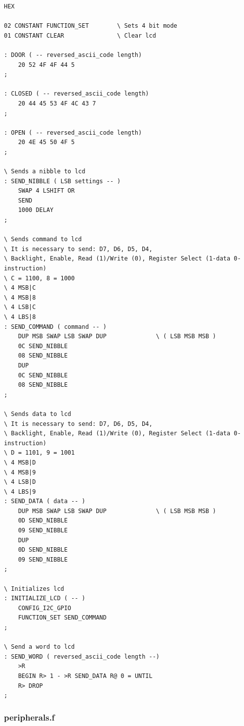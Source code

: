\documentclass[]{article}
\begin{document}
\begin{verbatim}
HEX

02 CONSTANT FUNCTION_SET        \ Sets 4 bit mode
01 CONSTANT CLEAR               \ Clear lcd 

: DOOR ( -- reversed_ascii_code length)
    20 52 4F 4F 44 5 
;

: CLOSED ( -- reversed_ascii_code length)
    20 44 45 53 4F 4C 43 7
;

: OPEN ( -- reversed_ascii_code length)
    20 4E 45 50 4F 5
;

\ Sends a nibble to lcd 
: SEND_NIBBLE ( LSB settings -- )
    SWAP 4 LSHIFT OR
    SEND
    1000 DELAY
;

\ Sends command to lcd 
\ It is necessary to send: D7, D6, D5, D4, 
\ Backlight, Enable, Read (1)/Write (0), Register Select (1-data 0-instruction)
\ C = 1100, 8 = 1000
\ 4 MSB|C 
\ 4 MSB|8
\ 4 LSB|C
\ 4 LBS|8
: SEND_COMMAND ( command -- )
    DUP MSB SWAP LSB SWAP DUP              \ ( LSB MSB MSB )
    0C SEND_NIBBLE 
    08 SEND_NIBBLE 
    DUP 
    0C SEND_NIBBLE
    08 SEND_NIBBLE
;

\ Sends data to lcd 
\ It is necessary to send: D7, D6, D5, D4, 
\ Backlight, Enable, Read (1)/Write (0), Register Select (1-data 0-instruction)
\ D = 1101, 9 = 1001
\ 4 MSB|D
\ 4 MSB|9
\ 4 LSB|D
\ 4 LBS|9
: SEND_DATA ( data -- ) 
    DUP MSB SWAP LSB SWAP DUP              \ ( LSB MSB MSB )
    0D SEND_NIBBLE  
    09 SEND_NIBBLE 
    DUP 
    0D SEND_NIBBLE
    09 SEND_NIBBLE 
;

\ Initializes lcd 
: INITIALIZE_LCD ( -- )
    CONFIG_I2C_GPIO
    FUNCTION_SET SEND_COMMAND
;

\ Send a word to lcd
: SEND_WORD ( reversed_ascii_code length --)
    >R 
    BEGIN R> 1 - >R SEND_DATA R@ 0 = UNTIL 
    R> DROP
;

\end{verbatim}

\subsubsection{peripherals.f}
\end{document}
